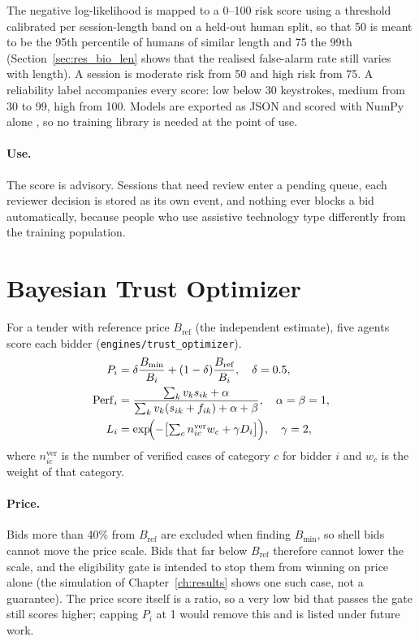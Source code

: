 The negative log-likelihood is mapped to a 0--100 risk score using a threshold calibrated per session-length band on a held-out human split, so that 50 is meant to be the 95th percentile of humans of similar length and 75 the 99th (Section~\ref{sec:res_bio_len} shows that the realised false-alarm rate still varies with length). A session is moderate risk from 50 and high risk from 75. A reliability label accompanies every score: low below 30 keystrokes, medium from 30 to 99, high from 100. Models are exported as JSON and scored with NumPy alone \cite{harris2020array}, so no training library is needed at the point of use.

\paragraph{Use.} The score is advisory. Sessions that need review enter a pending queue, each reviewer decision is stored as its own event, and nothing ever blocks a bid automatically, because people who use assistive technology type differently from the training population.

\section{Bayesian Trust Optimizer}
\label{sec:trust}
For a tender with reference price $B_{\text{ref}}$ (the independent estimate), five agents score each bidder (\texttt{engines/trust\_optimizer}).
\begin{align}
P_i&=\delta\frac{B_{\min}}{B_i}+(1-\delta)\frac{B_{\text{ref}}}{B_i},\quad \delta=0.5,\\
\mathrm{Perf}_i&=\frac{\sum_k v_ks_{ik}+\alpha}{\sum_k v_k(s_{ik}+f_{ik})+\alpha+\beta},\quad \alpha=\beta=1,\\
L_i&=\exp\!\Bigl(-\bigl[\textstyle\sum_c n^{\text{ver}}_{ic}w_c+\gamma D_i\bigr]\Bigr),\quad \gamma=2,
\end{align}
where $n^{\text{ver}}_{ic}$ is the number of verified cases of category $c$ for bidder $i$ and $w_c$ is the weight of that category.

\paragraph{Price.} Bids more than 40\% from $B_{\text{ref}}$ are excluded when finding $B_{\min}$, so shell bids cannot move the price scale. Bids that far below $B_{\text{ref}}$ therefore cannot lower the scale, and the eligibility gate is intended to stop them from winning on price alone (the simulation of Chapter~\ref{ch:results} shows one such case, not a guarantee). The price score itself is a ratio, so a very low bid that passes the gate still scores higher; capping $P_i$ at 1 would remove this and is listed under future work.

